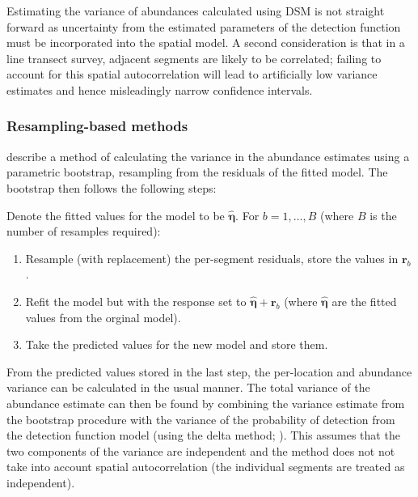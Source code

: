 \documentclass[a4paper,12pt]{article}
\begin{document}
Estimating the variance of abundances calculated using DSM is not straight forward as uncertainty from the estimated parameters of the detection function must be incorporated into the spatial model. A second consideration is that in a line transect survey, adjacent segments are likely to be correlated; failing to account for this spatial autocorrelation will lead to artificially low variance estimates and hence misleadingly narrow confidence intervals.

\subsubsection*{Resampling-based methods}

\cite{Hedley:2004et} describe a method of calculating the variance in the abundance estimates using a parametric bootstrap, resampling from the residuals of the fitted model. The bootstrap then follows the following steps:

Denote the fitted values for the model to be $\hat{\bm{\eta}}$. For $b=1,\ldots,B$ (where $B$ is the number of resamples required):
\begin{enumerate}
	\item Resample (with replacement) the per-segment residuals, store the values in $\mathbf{r}_{b}$.
	\item Refit the model but with the response set to $\hat{\bm{\eta}}+\mathbf{r}_{b}$ (where $\hat{\bm{\eta}}$ are the fitted values from the orginal model).
	\item Take the predicted values for the new model and store them.
\end{enumerate}
From the predicted values stored in the last step, the per-location and abundance variance can be calculated in the usual manner. The total variance of the abundance estimate can then be found by combining the variance estimate from the bootstrap procedure with the variance of the probability of detection from the detection function model (using the delta method; \cite{Seber:2002ti}). This assumes that the two components of the variance are independent and the method does not not take into account spatial autocorrelation (the individual segments are treated as independent).
\end{document}
